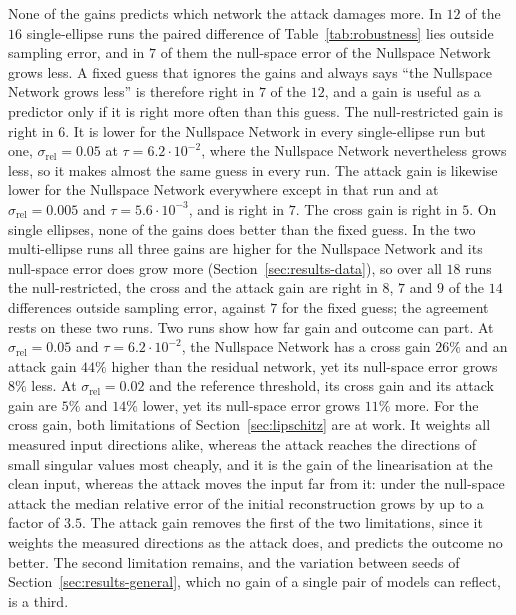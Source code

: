 \documentclass{article}
\numberwithin{equation}{section}
\begin{document}
None of the gains predicts which network the attack damages more. In $12$ of the $16$ single-ellipse runs
the paired difference of Table~\ref{tab:robustness} lies outside sampling error, and in $7$ of them the
null-space error of the Nullspace Network grows less. A fixed guess that ignores the gains and always
says ``the Nullspace Network grows less'' is therefore right in $7$ of the $12$, and a gain is useful as a
predictor only if it is right more often than this guess. The null-restricted gain is right in $6$. It is
lower for the Nullspace Network in every single-ellipse run but one, $\sigma_\text{rel}=0.05$ at
$\tau=6.2\cdot10^{-2}$, where the Nullspace Network nevertheless grows less, so it makes almost the same
guess in every run. The attack gain is likewise lower for the Nullspace Network everywhere except in that
run and at $\sigma_\text{rel}=0.005$ and $\tau=5.6\cdot10^{-3}$, and is right in $7$. The cross gain is right
in $5$. On single ellipses, none of the gains does better than the fixed guess. In the two multi-ellipse
runs all three gains are higher for the Nullspace Network and its null-space error does grow more
(Section~\ref{sec:results-data}), so over all $18$ runs the null-restricted, the cross and the attack gain
are right in $8$, $7$ and $9$ of the $14$ differences outside sampling error, against $7$ for the fixed
guess; the agreement rests on these two runs.
Two runs show how far gain and outcome can part. At $\sigma_\text{rel}=0.05$ and $\tau=6.2\cdot10^{-2}$, the
Nullspace Network has a cross gain $26\%$ and an attack gain $44\%$ higher than the residual network, yet its
null-space error grows $8\%$ less. At $\sigma_\text{rel}=0.02$ and the reference threshold, its cross gain
and its attack gain are $5\%$ and $14\%$ lower, yet its null-space error grows $11\%$ more. For the cross
gain, both limitations of Section~\ref{sec:lipschitz} are at work. It weights all measured input directions
alike, whereas the attack reaches the directions of small singular values most cheaply,
and it is the gain of the linearisation at the clean input, whereas the attack moves the input far
from it: under the null-space attack the median relative error of the initial reconstruction grows by
up to a factor of $3.5$. The attack gain removes the first of the two limitations, since it weights the
measured directions as the attack does, and predicts the outcome no better. The second limitation
remains, and the variation between seeds of Section~\ref{sec:results-general}, which no gain of a single
pair of models can reflect, is a third.
\end{document}
